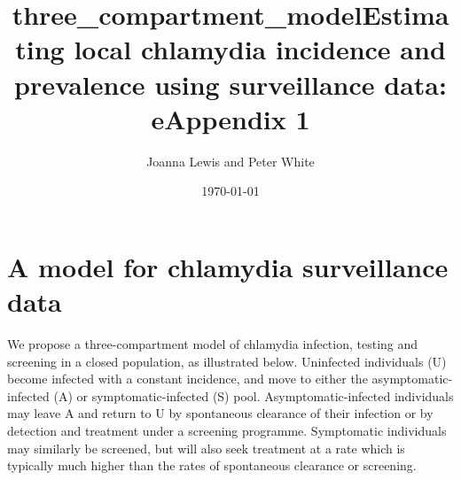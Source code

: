 \documentclass{article}
\title{three\_compartment\_model}
\begin{document}
    
    
    \author{Joanna Lewis and Peter White}\title{Estimating local chlamydia incidence and prevalence using surveillance data: eAppendix 1}

\date{\today}
\maketitle

\tableofcontents


    
    

    
    \section{A model for chlamydia surveillance
data}\label{a-model-for-chlamydia-surveillance-data}

We propose a three-compartment model of chlamydia infection, testing and
screening in a closed population, as illustrated below. Uninfected
individuals (U) become infected with a constant incidence, and move to
either the asymptomatic-infected (A) or symptomatic-infected (S) pool.
Asymptomatic-infected individuals may leave A and return to U by
spontaneous clearance of their infection or by detection and treatment
under a screening programme. Symptomatic individuals may similarly be
screened, but will also seek treatment at a rate which is typically much
higher than the rates of spontaneous clearance or screening.
\end{document}
